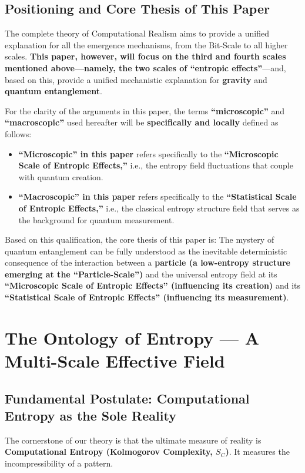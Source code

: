 \documentclass[11pt]{article}
\begin{document}
\subsection{Positioning and Core Thesis of This Paper}

The complete theory of Computational Realism aims to provide a unified explanation for all the emergence mechanisms, from the Bit-Scale to all higher scales. \textbf{This paper, however, will focus on the third and fourth scales mentioned above—namely, the two scales of ``entropic effects''}—and, based on this, provide a unified mechanistic explanation for \textbf{gravity} and \textbf{quantum entanglement}.

For the clarity of the arguments in this paper, the terms \textbf{``microscopic''} and \textbf{``macroscopic''} used hereafter will be \textbf{specifically and locally} defined as follows:
\begin{itemize}
    \item   \textbf{``Microscopic'' in this paper} refers specifically to the \textbf{``Microscopic Scale of Entropic Effects,''} i.e., the entropy field fluctuations that couple with quantum creation.
    \item   \textbf{``Macroscopic'' in this paper} refers specifically to the \textbf{``Statistical Scale of Entropic Effects,''} i.e., the classical entropy structure field that serves as the background for quantum measurement.
\end{itemize}

\noindent Based on this qualification, the core thesis of this paper is: The mystery of quantum entanglement can be fully understood as the inevitable deterministic consequence of the interaction between a \textbf{particle (a low-entropy structure emerging at the ``Particle-Scale'')} and the universal entropy field at its \textbf{``Microscopic Scale of Entropic Effects'' (influencing its creation)} and its \textbf{``Statistical Scale of Entropic Effects'' (influencing its measurement)}.


\section{The Ontology of Entropy — A Multi-Scale Effective Field}

\subsection{Fundamental Postulate: Computational Entropy as the Sole Reality}
The cornerstone of our theory is that the ultimate measure of reality is \textbf{Computational Entropy (Kolmogorov Complexity, $S_C$)}. It measures the incompressibility of a pattern.
\end{document}
